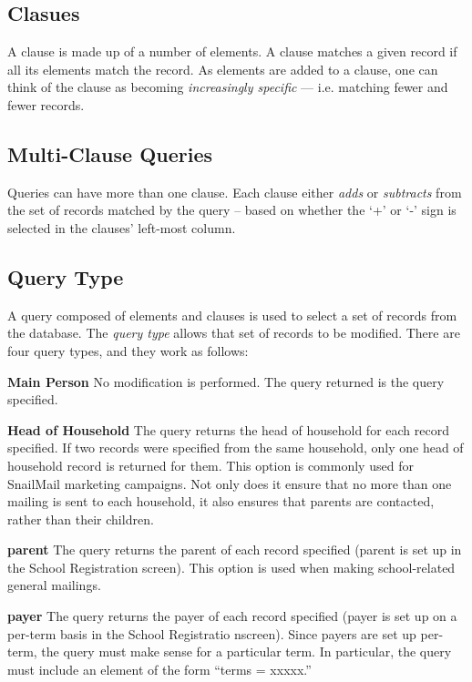 \documentclass[11pt]{article}
\begin{document}
\subsection{Clasues}

A clause is made up of a number of elements.  A clause matches a given record if all its elements match the record.  As elements are added to a clause, one can think of the clause as becoming \emph{increasingly specific} --- i.e. matching fewer and fewer records.

\subsection{Multi-Clause Queries}

Queries can have more than one clause.  Each clause either \emph{adds} or \emph{subtracts} from the set of records matched by the query -- based on whether the `+' or `-' sign is selected in the clauses' left-most column.

\subsection{Query Type}

A query composed of elements and clauses is used to select a set of records from the database.  The \emph{query type} allows that set of records to be modified.  There are four query types, and they work as follows:

\begin{description}

\item{{\bf Main Person}} No modification is performed.  The query returned is the query specified.

\item{{\bf Head of Household}} The query returns the head of household for each record specified.  If two records were specified from the same household, only one head of household record is returned for them.  This option is commonly used for SnailMail marketing campaigns.  Not only does it ensure that no more than one mailing is sent to each household, it also ensures that parents are contacted, rather than their children.

\item{{\bf parent}} The query returns the parent of each record specified (parent is set up in the School Registration screen).  This option is used when making school-related general mailings.

\item{{\bf payer}} The query returns the payer of each record specified (payer is set up on a per-term basis in the School Registratio nscreen).  Since payers are set up per-term, the query must make sense for a particular term.   In particular, the query must include an element of the form ``terms = xxxxx.''

\end{description}
\end{document}
